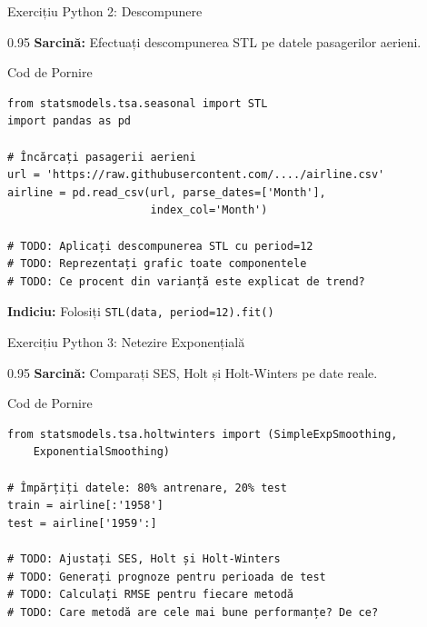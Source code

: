 \documentclass[9pt, aspectratio=169, t]{beamer}
\begin{document}
\begin{frame}[fragile]{Exercițiu Python 2: Descompunere}
    \begin{cminipage}{0.95\textwidth}
    \textbf{Sarcină:} Efectuați descompunerea STL pe datele pasagerilor aerieni.

    \vspace{0.3cm}

    \begin{block}{Cod de Pornire}
    \small
    \begin{verbatim}
from statsmodels.tsa.seasonal import STL
import pandas as pd

# Încărcați pasagerii aerieni
url = 'https://raw.githubusercontent.com/..../airline.csv'
airline = pd.read_csv(url, parse_dates=['Month'],
                      index_col='Month')

# TODO: Aplicați descompunerea STL cu period=12
# TODO: Reprezentați grafic toate componentele
# TODO: Ce procent din varianță este explicat de trend?
    \end{verbatim}
    \end{block}

    \textbf{Indiciu:} Folosiți \texttt{STL(data, period=12).fit()}
    \end{cminipage}
\end{frame}

\begin{frame}[fragile]{Exercițiu Python 3: Netezire Exponențială}
    \begin{cminipage}{0.95\textwidth}
    \textbf{Sarcină:} Comparați SES, Holt și Holt-Winters pe date reale.

    \vspace{0.3cm}

    \begin{block}{Cod de Pornire}
    \small
    \begin{verbatim}
from statsmodels.tsa.holtwinters import (SimpleExpSmoothing,
    ExponentialSmoothing)

# Împărțiți datele: 80% antrenare, 20% test
train = airline[:'1958']
test = airline['1959':]

# TODO: Ajustați SES, Holt și Holt-Winters
# TODO: Generați prognoze pentru perioada de test
# TODO: Calculați RMSE pentru fiecare metodă
# TODO: Care metodă are cele mai bune performanțe? De ce?
    \end{verbatim}
    \end{block}
    \end{cminipage}
\end{frame}
\end{document}
